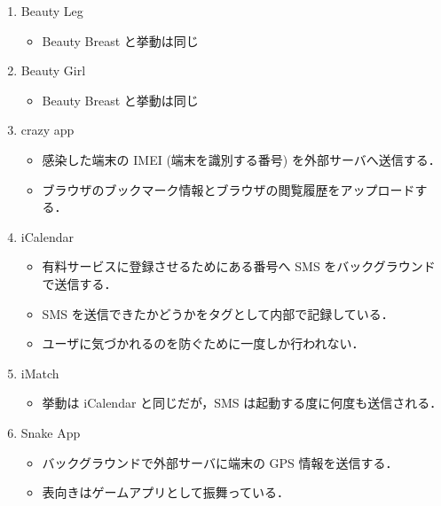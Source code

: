 \begin{enumerate}
\item Beauty Leg
	\begin{itemize}
	\item Beauty Breast と挙動は同じ
	\end{itemize}

\item Beauty Girl
	\begin{itemize}
	\item Beauty Breast と挙動は同じ
	\end{itemize}

\item crazy app
	\begin{itemize}
	\item 感染した端末の IMEI (端末を識別する番号) を外部サーバへ送信する．
	\item  ブラウザのブックマーク情報とブラウザの閲覧履歴をアップロードする．
	\end{itemize}
\item iCalendar
	\begin{itemize}
	\item 有料サービスに登録させるためにある番号へ SMS をバックグラウンドで送信する．
	\item SMS  を送信できたかどうかをタグとして内部で記録している．
	\item ユーザに気づかれるのを防ぐために一度しか行われない．
	\end{itemize}
	
\item iMatch
	\begin{itemize}
	\item 挙動は iCalendar と同じだが，SMS は起動する度に何度も送信される．
	\end{itemize}
	
\item Snake App
	\begin{itemize}
	\item バックグラウンドで外部サーバに端末の GPS 情報を送信する．
	\item 表向きはゲームアプリとして振舞っている．
	\end{itemize}
	


\end{enumerate}
